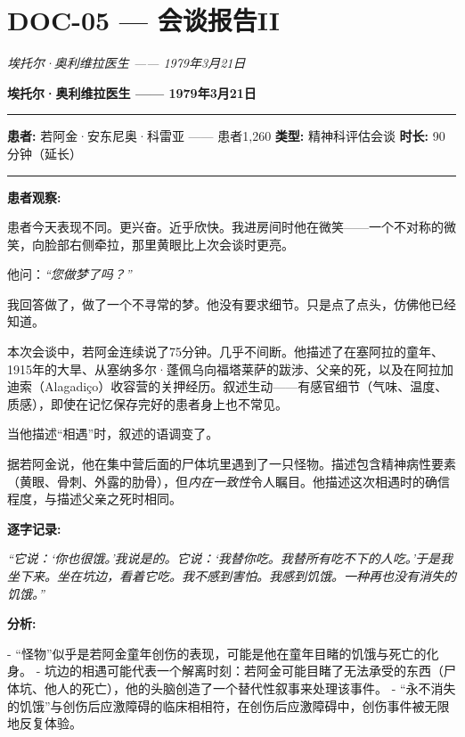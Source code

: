 \section*{\textbf{DOC-05} --- 会谈报告II}

\noindent \textit{埃托尔·奥利维拉医生 —— 1979年3月21日}

\noindent \textbf{埃托尔·奥利维拉医生 —— 1979年3月21日}

\vspace{0.5em}\noindent\rule{\textwidth}{0.5pt}\vspace{0.5em}

\noindent \textbf{患者:} 若阿金·安东尼奥·科雷亚 —— 患者1,260
\textbf{类型:} 精神科评估会谈
\textbf{时长:} 90分钟（延长）

\vspace{0.5em}\noindent\rule{\textwidth}{0.5pt}\vspace{0.5em}

\noindent \textbf{患者观察:}

\noindent 患者今天表现不同。更兴奋。近乎欣快。我进房间时他在微笑——一个不对称的微笑，向脸部右侧牵拉，那里黄眼比上次会谈时更亮。

\noindent 他问：\textit{“您做梦了吗？”}

\noindent 我回答做了，做了一个不寻常的梦。他没有要求细节。只是点了点头，仿佛他已经知道。

\noindent 本次会谈中，若阿金连续说了75分钟。几乎不间断。他描述了在塞阿拉的童年、1915年的大旱、从塞纳多尔·蓬佩乌向福塔莱萨的跋涉、父亲的死，以及在阿拉加迪索（Alagadiço）收容营的关押经历。叙述生动——有感官细节（气味、温度、质感），即使在记忆保存完好的患者身上也不常见。

\noindent 当他描述“相遇”时，叙述的语调变了。

\noindent 据若阿金说，他在集中营后面的尸体坑里遇到了一只怪物。描述包含精神病性要素（黄眼、骨刺、外露的肋骨），但\textit{内在一致性}令人瞩目。他描述这次相遇时的确信程度，与描述父亲之死时相同。

\noindent \textbf{逐字记录:}

\noindent \textit{“它说：‘你也很饿。’我说是的。它说：‘我替你吃。我替所有吃不下的人吃。’于是我坐下来。坐在坑边，看着它吃。我不感到害怕。我感到饥饿。一种再也没有消失的饥饿。”}

\noindent \textbf{分析:}

\noindent - “怪物”似乎是若阿金童年创伤的表现，可能是他在童年目睹的饥饿与死亡的化身。
- 坑边的相遇可能代表一个解离时刻：若阿金可能目睹了无法承受的东西（尸体坑、他人的死亡），他的头脑创造了一个替代性叙事来处理该事件。
- “永不消失的饥饿”与创伤后应激障碍的临床相相符，在创伤后应激障碍中，创伤事件被无限地反复体验。

